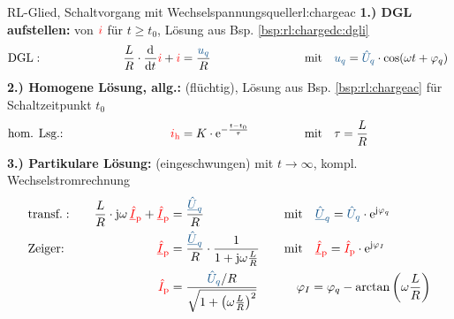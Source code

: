 {\begin{bsp}{RL-Glied, Schaltvorgang mit Wechselspannungsquelle}{rl:chargeac}
        \textbf{1.) DGL aufstellen:} von ${\color{red}i}$ für $t \geq t_0$, Lösung aus Bsp. \ref{bsp:rl:chargedc:dgli}
        \begin{align*}
            &\text{DGL}:&&&
                \frac{L}{R} \cdot \dt \eci{i}  + \eci{i}   &= \frac{\ecv{u_q}}{R}&&&
                &\text{mit}\quad \ecv{u_q} = \ecv{\hat{U}_q} \cdot \cos(\omega t + \varphi_q)
            \\[-15pt]&\hphantom{R1oooooooooo}&&&\hphantom{L3ooooooooooo}&\hphantom{R3ooooooooooooooo}&&&&\hphantom{R5ooooooooooooooooooooooo}\nonumber%
        \end{align*}%
        \textbf{2.) Homogene Lösung, allg.:} (flüchtig), Lösung aus Bsp. \ref{bsp:rl:chargeac} für Schaltzeitpunkt $t_0$
        \begin{align*}
            &\text{hom. Lsg.:} &&&
                \eci{i_{\mathrm{h}}}&= K \cdot \mathrm{e}^{-\frac{t-t_0}{\tau}} &&&
                &\text{mit}\quad \tau = \frac{L}{R}
            \\[-15pt]&\hphantom{R1oooooooooo}&&&\hphantom{L3ooooooooooo}&\hphantom{R3ooooooooooooooo}&&&&\hphantom{R5ooooooooooooooooooooooo}\nonumber%
        \end{align*}%
        \textbf{3.) Partikulare Lösung:} (eingeschwungen) mit $t \to \infty$, kompl. Wechselstromrechnung%
        \begin{align*}%
                &\text{transf.}:&&&
                \frac{L}{R} \cdot \mathrm{j}\omega\, \eci{\underline{\hat{I}}_{\mathrm p}} + \eci{\underline{\hat{I}}_{\mathrm p}} &= \frac{\ecv{\underline{\hat{U}}_q}}{R} &&&
                    &\text{mit}\quad \ecv{\underline{\hat{U}}_q}=\ecv{\hat{U}_q} \cdot \mathrm{e}^{\mathrm{j}\varphi_q}\\
                &\text{Zeiger:}&&&
                    \eci{\underline{\hat{I}}_{\mathrm p}} &= \frac{\ecv{\underline{\hat{U}}_q}}{R} \cdot \frac{1}{1 + \mathrm{j} \omega \frac{L}{R}} &&&
                    &\text{mit}\quad \eci{\underline{\hat{I}}_{\mathrm p}} = \eci{\hat{I}_{\mathrm p}}\cdot\mathrm{e}^{\mathrm{j}\varphi_I}\\
                &&&&
                    \eci{\hat{I}_{\mathrm p}} &=  \frac{\ecv{\hat{U}_q}/R}{\sqrt{1 + \left(\omega \frac{L}{R}\right)^2}} &&&
                    &\quad \varphi_I = \varphi_q - \arctan\left(\omega \frac{L}{R}\right) \\

\end{align*}
\end{bsp}}
